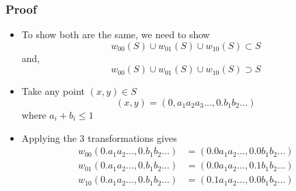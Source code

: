 \documentclass{beamer}
\begin{document}

\begin{frame}
    \frametitle{Proof} %
    \begin{itemize}
        \item To show both are the same, we need to show
        \begin{equation*}
            w_{00}(S) \cup w_{01}(S) \cup w_{10}(S) \subset S 
        \end{equation*}
        and, 
        \begin{equation*}
            w_{00}(S) \cup w_{01}(S) \cup w_{10}(S) \supset S
        \end{equation*}
        \item Take any point $(x,y) \in S$ 
        \begin{equation*}
            (x,y) = (0,a_1a_2a_3\dots,0.b_1 b_2 \dots)
        \end{equation*}
        where $a_i + b_i \leq 1$
        \item Applying the 3 transformations gives 
        \begin{align*}
            w_{00}(0.a_1a_2\dots,0.b_1 b_2 \dots) &= (0.0a_1a_2\dots,0.0b_1 b_2 \dots) \\
            w_{01}(0.a_1a_2\dots,0.b_1 b_2 \dots) &= (0.0a_1a_2\dots,0.1b_1 b_2 \dots) \\
            w_{10}(0.a_1a_2\dots,0.b_1 b_2 \dots) &= (0.1a_1a_2\dots,0.0b_1 b_2 \dots)
        \end{align*}
    \end{itemize}
\end{frame}
\end{document}
